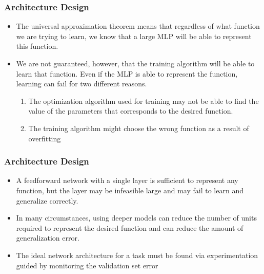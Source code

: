 \documentclass[
  shownotes,
  xcolor={svgnames},
  hyperref={colorlinks,citecolor=DarkBlue,linkcolor=DarkRed,urlcolor=DarkBlue}
  , aspectratio=169]{beamer}
\begin{document}
\begin{frame}
\frametitle{Architecture Design}

\begin{itemize}

    \item The universal approximation theorem means that regardless of what function we are trying to learn, we know that a large MLP will be able to represent this function. 
    \medskip
    \item We are not guaranteed, however, that the training algorithm will be able to learn that function. Even if the MLP is able to represent the function, learning can fail for two different reasons. 
    \medskip
            \begin{enumerate}
                \item The optimization algorithm used for training may not be able to find the value of the parameters that corresponds
                to the desired function. 
                \medskip
                \item The training algorithm might choose the wrong function as a result of overﬁtting
            \end{enumerate}


\end{itemize}

\end{frame}
\begin{frame}
\frametitle{Architecture Design}

\begin{itemize}
    \item A feedforward network with a single layer is sufficient to represent any function, but the layer may be infeasible large and may fail to learn and generalize correctly.
    \medskip
    \item  In many circumstances, using deeper models can reduce the number of units required to represent the desired function and can reduce the amount of generalization error.
    \medskip
    \item  The ideal network architecture for a task must be found via experimentation guided by monitoring the validation set error
\end{itemize}
\end{frame}
\end{document}
